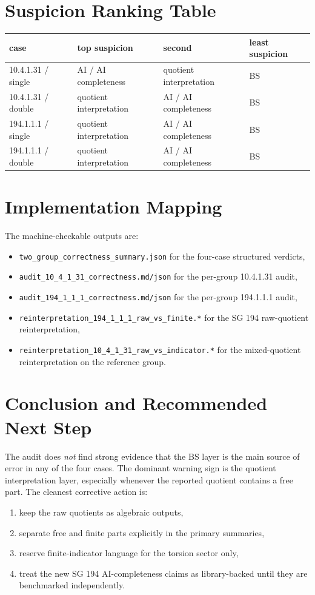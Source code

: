 \documentclass[11pt]{article}
\begin{document}
\section{Suspicion Ranking Table}
\begin{center}
\begin{tabular}{llll}
\toprule
case & top suspicion & second & least suspicion \\
\midrule
10.4.1.31 / single & AI / AI completeness & quotient interpretation & BS \\
10.4.1.31 / double & quotient interpretation & AI / AI completeness & BS \\
194.1.1.1 / single & quotient interpretation & AI / AI completeness & BS \\
194.1.1.1 / double & quotient interpretation & AI / AI completeness & BS \\
\bottomrule
\end{tabular}
\end{center}

\section{Implementation Mapping}
The machine-checkable outputs are:
\begin{itemize}
\item \texttt{two\_group\_correctness\_summary.json} for the four-case structured verdicts,
\item \texttt{audit\_10\_4\_1\_31\_correctness.md/json} for the per-group 10.4.1.31 audit,
\item \texttt{audit\_194\_1\_1\_1\_correctness.md/json} for the per-group 194.1.1.1 audit,
\item \texttt{reinterpretation\_194\_1\_1\_1\_raw\_vs\_finite.*} for the SG 194 raw-quotient reinterpretation,
\item \texttt{reinterpretation\_10\_4\_1\_31\_raw\_vs\_indicator.*} for the mixed-quotient reinterpretation on the reference group.
\end{itemize}

\section{Conclusion and Recommended Next Step}
The audit does \emph{not} find strong evidence that the BS layer is the main source of error in any of the four cases. The dominant warning sign is the quotient interpretation layer, especially whenever the reported quotient contains a free part. The cleanest corrective action is:
\begin{enumerate}
\item keep the raw quotients as algebraic outputs,
\item separate free and finite parts explicitly in the primary summaries,
\item reserve finite-indicator language for the torsion sector only,
\item treat the new SG 194 AI-completeness claims as library-backed until they are benchmarked independently.
\end{enumerate}
\end{document}
